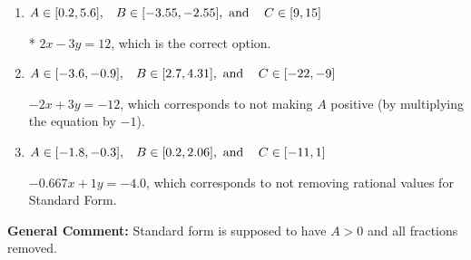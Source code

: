 \documentclass{extbook}[14pt]
\begin{document}
\begin{enumerate}
{\begin{enumerate}[label=\Alph*.]
 $2x + 3y = -12$, which corresponds to using the opposite (negative) slope of the graph, but did everything else correctly.
\item \( A \in [0.2, 5.6], \hspace{3mm} B \in [-3.55, -2.55], \text{ and } \hspace{3mm} C \in [9, 15] \)

* $2x - 3y = 12$, which is the correct option.
\item \( A \in [-3.6, -0.9], \hspace{3mm} B \in [2.7, 4.31], \text{ and } \hspace{3mm} C \in [-22, -9] \)

 $-2x + 3y = -12$, which corresponds to not making $A$ positive (by multiplying the equation by $-1$).
\item \( A \in [-1.8, -0.3], \hspace{3mm} B \in [0.2, 2.06], \text{ and } \hspace{3mm} C \in [-11, 1] \)

 $-0.667x + 1y = -4.0$, which corresponds to not removing rational values for Standard Form.
\end{enumerate}

\textbf{General Comment:} Standard form is supposed to have $A > 0$ and all fractions removed.
}
\end{enumerate}
\end{document}
